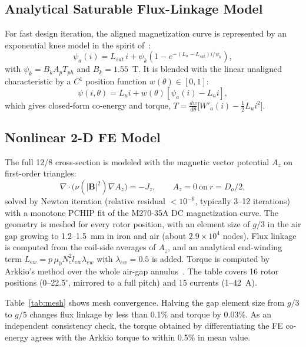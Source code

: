 \documentclass[journal]{IEEEtran}
\begin{document}
\subsection{Analytical Saturable Flux-Linkage Model}
For fast design iteration, the aligned magnetization curve is represented by an
exponential knee model in the spirit of~\cite{torrey1990,ilic1987}:
\begin{equation}
\psi_a(i) = L_{sat}\,i + \psi_k\left(1-e^{-(L_a-L_{sat})i/\psi_k}\right),
\label{eq:psia}
\end{equation}
with $\psi_k=B_kA_pT_{ph}$ and $B_k=1.55$~T. It is blended with the linear
unaligned characteristic by a $C^1$ position function $w(\theta)\in[0,1]$:
\begin{equation}
\psi(i,\theta)=L_u i + w(\theta)\left[\psi_a(i)-L_u i\right],
\label{eq:psi}
\end{equation}
which gives closed-form co-energy and torque,
$T=\tfrac{dw}{d\theta}\big[W'_a(i)-\tfrac12L_ui^2\big]$.

\subsection{Nonlinear 2-D FE Model}
\label{sec:fea}
The full 12/8 cross-section is modeled with the magnetic vector potential
$A_z$ on first-order triangles:
\begin{equation}
\nabla\cdot\big(\nu(|\mathbf B|^2)\nabla A_z\big)=-J_z,\qquad A_z=0\ \text{on}\ r=D_o/2,
\label{eq:fe}
\end{equation}
solved by Newton iteration (relative residual $<10^{-6}$, typically 3--12
iterations) with a monotone PCHIP fit of the M270-35A DC magnetization curve.
The geometry is meshed for every rotor position, with an element size of $g/3$
in the air gap growing to 1.2--1.5~mm in iron and air (about $2.9\times10^4$
nodes). Flux linkage is computed from the coil-side averages of $A_z$, and an
analytical end-winding term $L_{ew}=p\,\mu_0N_c^2l_{ew}\lambda_{ew}$ with
$\lambda_{ew}=0.5$ is added. Torque is computed by Arkkio's method over the whole
air-gap annulus~\cite{arkkio1987}. The table covers 16 rotor positions
(0--22.5$^\circ$, mirrored to a full pitch) and 15 currents (1--42~A).

Table~\ref{tab:mesh} shows mesh convergence. Halving the gap element size from
$g/3$ to $g/5$ changes flux linkage by less than 0.1\% and torque by 0.03\%. As
an independent consistency check, the torque obtained by differentiating the
FE co-energy agrees with the Arkkio torque to within 0.5\% in mean value.
\end{document}
